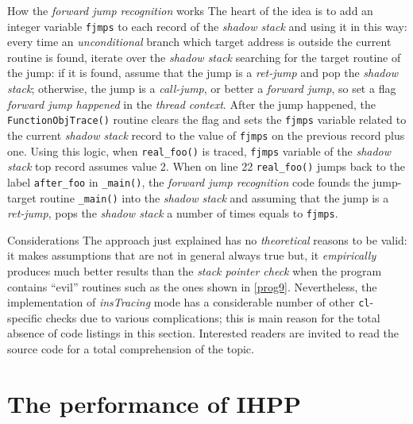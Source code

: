 \documentclass[a4paper,10pt]{report}
\begin{document}
\begin{paragraph}{How the \emph{forward jump recognition} works}
The heart of the idea is to add an integer variable \verb|fjmps| to each
record of the \emph{shadow stack} and using it in this way:
every time an \emph{unconditional} branch which target address is outside
the current routine is found, iterate over the \emph{shadow stack} searching
for the target routine of the jump: if it is found, assume that the jump is 
a \emph{ret-jump} and pop the \emph{shadow stack}; otherwise, the jump
is a \emph{call-jump}, or better a \emph{forward jump}, 
so set a flag \emph{forward jump happened} in the \emph{thread context}.
After the jump happened, the \verb|FunctionObjTrace()| routine clears the flag
and sets the \verb|fjmps| variable related to the current \emph{shadow stack} record
to the value of \verb|fjmps| on the previous record plus one. 
Using this logic, when \verb|real_foo()| is traced, \verb|fjmps| variable 
of the \emph{shadow stack} top record assumes value 2. 
When on line 22 \verb|real_foo()| jumps back to the label \verb|after_foo| in 
\verb|_main()|, the \emph{forward jump recognition} code founds the 
jump-target routine \verb|_main()| into the \emph{shadow stack} and 
assuming that the jump is a \emph{ret-jump}, pops the \emph{shadow stack} 
a number of times equals to \verb|fjmps|. 
\end{paragraph}

\begin{paragraph}{Considerations}
The approach just explained has no \emph{theoretical} reasons to be valid:
it makes assumptions that are not in general always true but, it \emph{empirically}
produces much better results than the \emph{stack pointer check} when the program
contains ``evil'' routines such as the ones shown in \cref{prog9}.
Nevertheless, the implementation of \emph{insTracing} mode has 
a considerable number of other \verb|cl|-specific checks 
due to various complications; this is main reason for the total absence of
code listings in this section. 
Interested readers are invited to read the source code for a total comprehension
of the topic.

\end{paragraph}

\section{The performance of IHPP}
\end{document}
